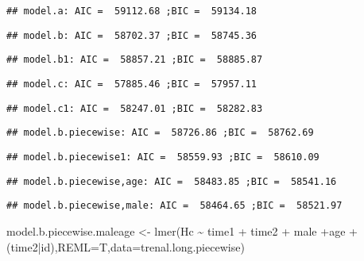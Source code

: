 \documentclass[
]{article}
\newenvironment{Shaded}{\begin{snugshade}}{\end{snugshade}}
\newcommand{\AttributeTok}[1]{\textcolor[rgb]{0.77,0.63,0.00}{#1}}
\newcommand{\FunctionTok}[1]{\textcolor[rgb]{0.00,0.00,0.00}{#1}}
\newcommand{\NormalTok}[1]{#1}
\newcommand{\OtherTok}[1]{\textcolor[rgb]{0.56,0.35,0.01}{#1}}
\newcommand{\SpecialCharTok}[1]{\textcolor[rgb]{0.00,0.00,0.00}{#1}}
\begin{document}
\begin{verbatim}
## model.a: AIC =  59112.68 ;BIC =  59134.18
\end{verbatim}

\begin{verbatim}
## model.b: AIC =  58702.37 ;BIC =  58745.36
\end{verbatim}

\begin{verbatim}
## model.b1: AIC =  58857.21 ;BIC =  58885.87
\end{verbatim}

\begin{verbatim}
## model.c: AIC =  57885.46 ;BIC =  57957.11
\end{verbatim}

\begin{verbatim}
## model.c1: AIC =  58247.01 ;BIC =  58282.83
\end{verbatim}

\begin{verbatim}
## model.b.piecewise: AIC =  58726.86 ;BIC =  58762.69
\end{verbatim}

\begin{verbatim}
## model.b.piecewise1: AIC =  58559.93 ;BIC =  58610.09
\end{verbatim}

\begin{verbatim}
## model.b.piecewise,age: AIC =  58483.85 ;BIC =  58541.16
\end{verbatim}

\begin{verbatim}
## model.b.piecewise,male: AIC =  58464.65 ;BIC =  58521.97
\end{verbatim}

\begin{Shaded}
\begin{Highlighting}[]
\NormalTok{model.b.piecewise.maleage }\OtherTok{\textless{}{-}} \FunctionTok{lmer}\NormalTok{(Hc }\SpecialCharTok{\textasciitilde{}}\NormalTok{ time1 }\SpecialCharTok{+}\NormalTok{ time2 }\SpecialCharTok{+}\NormalTok{ male }\SpecialCharTok{+}\NormalTok{age }\SpecialCharTok{+}\NormalTok{(time2}\SpecialCharTok{|}\NormalTok{id),}\AttributeTok{REML=}\NormalTok{T,}\AttributeTok{data=}\NormalTok{trenal.long.piecewise)}
\end{Highlighting}
\end{Shaded}
\end{document}
